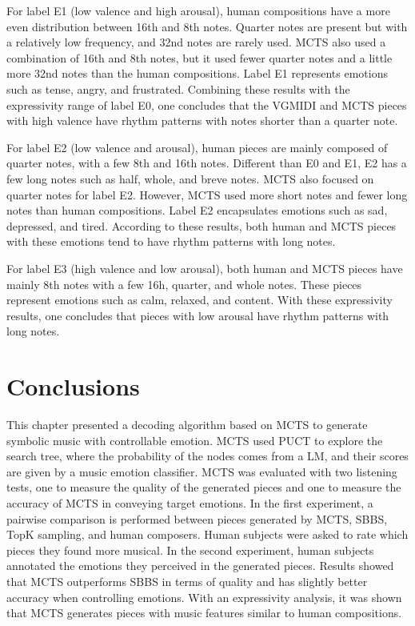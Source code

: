 For label E1 (low valence and high arousal), human compositions have a more even distribution between 16th and 8th notes. Quarter notes are present but with a relatively low frequency, and 32nd notes are rarely used. MCTS also used a combination of 16th and 8th notes, but it used fewer quarter notes and a little more 32nd notes than the human compositions. Label E1 represents emotions such as tense, angry, and frustrated. Combining these results with the expressivity range of label E0, one concludes that the VGMIDI and MCTS pieces with high valence have rhythm patterns with notes shorter than a quarter note.

For label E2 (low valence and arousal), human pieces are mainly composed of quarter notes, with a few 8th and 16th notes. Different than E0 and E1, E2 has a few long notes such as half, whole, and breve notes. MCTS also focused on quarter notes for label E2. However, MCTS used more short notes and fewer long notes than human compositions. Label E2 encapsulates emotions such as sad, depressed, and tired. According to these results, both human and MCTS pieces with these emotions tend to have rhythm patterns with long notes.


For label E3 (high valence and low arousal), both human and MCTS pieces have mainly 8th notes with a few 16h, quarter, and whole notes. These pieces represent emotions such as calm, relaxed, and content. With these expressivity results, one concludes that pieces with low arousal have rhythm patterns with long notes.


\section{Conclusions}

This chapter presented a decoding algorithm based on MCTS to generate symbolic music with controllable emotion. MCTS used PUCT to explore the search tree, where the probability of the nodes comes from a LM, and their scores are given by a music emotion classifier. MCTS was evaluated with two listening tests, one to measure the quality of the generated pieces and one to measure the accuracy of MCTS in conveying target emotions. In the first experiment, a pairwise comparison is performed between pieces generated by MCTS, SBBS, TopK sampling, and human composers. Human subjects were asked to rate which pieces they found more musical. In the second experiment, human subjects annotated the emotions they perceived in the generated pieces. Results showed that MCTS outperforms SBBS in terms of quality and has slightly better accuracy when controlling emotions. With an expressivity analysis, it was shown that MCTS generates pieces with music features similar to human compositions.

